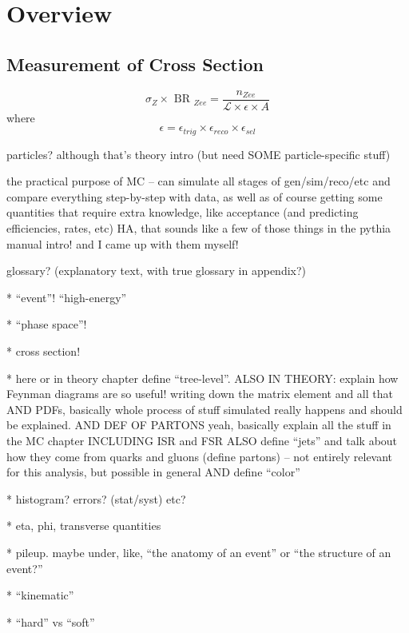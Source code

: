 \chapter{Overview}
\label{over}
\section{Measurement of Cross Section}
\label{over:xsec}
\[
\sigma_{ Z } \times \textrm{ BR }_{ Zee } = \frac{ n_{ Zee } }{  \mathcal{ L } \times \epsilon \times A}
\]
where
\[
\epsilon = \epsilon_{ trig } \times \epsilon_{ reco } \times \epsilon_{ sel }
\]

particles?  although that's theory intro (but need SOME particle-specific stuff) 

the practical purpose of MC -- can simulate all stages of gen/sim/reco/etc and compare 
everything step-by-step with data, as well as of course getting some quantities 
that require extra knowledge, like acceptance (and predicting efficiencies, rates, etc)
HA, that sounds like a few of those things in the pythia manual intro!  and I came 
up with them myself!  

glossary? (explanatory text, with true glossary in appendix?)  

   * ``event''!  ``high-energy''

   * ``phase space''!

   * cross section!

   * here or in theory chapter define ``tree-level''.  
ALSO IN THEORY: explain how Feynman diagrams are so useful! 
writing down the matrix element and all that
AND PDFs, basically whole process of stuff simulated 
really happens and should be explained.  
AND DEF OF PARTONS
yeah, basically explain all the stuff in the MC chapter
INCLUDING ISR and FSR
ALSO define ``jets'' and talk about how they come from 
quarks and gluons (define partons) -- 
not entirely relevant for this analysis, 
but possible in general
AND define ``color''

   * histogram?  errors? (stat/syst) etc?

   * eta, phi, transverse quantities

   * pileup.  maybe under, like, ``the anatomy of an event'' or ``the structure of an event?''

   * ``kinematic''

   * ``hard'' vs ``soft''

